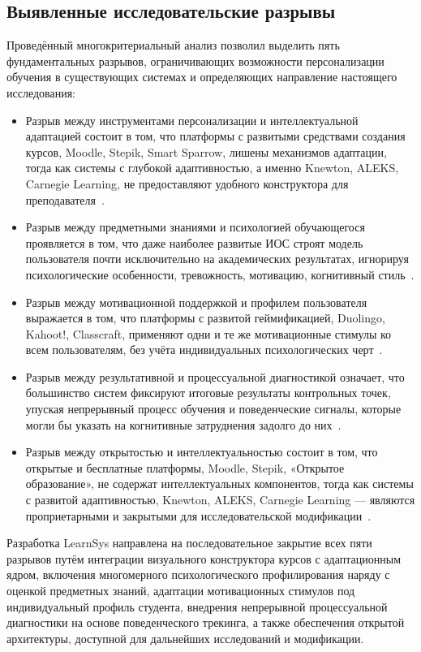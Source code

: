 \subsection{Выявленные исследовательские разрывы}

Проведённый многокритериальный анализ позволил выделить пять
фундаментальных разрывов, ограничивающих возможности
персонализации обучения в существующих системах и
определяющих направление настоящего исследования:

\begin{itemize}
\item Разрыв между инструментами персонализации и интеллектуальной
адаптацией состоит в том, что платформы с развитыми средствами
создания курсов, Moodle, Stepik, Smart Sparrow, лишены
механизмов адаптации, тогда как системы с глубокой адаптивностью, а именно
Knewton, ALEKS, Carnegie Learning, не предоставляют удобного
конструктора для преподавателя~\cite{graf2007adaptive}.
\item Разрыв между предметными знаниями и психологией
обучающегося проявляется в том, что даже наиболее развитые
ИОС строят модель пользователя почти исключительно на
академических результатах, игнорируя психологические
особенности, тревожность, мотивацию, когнитивный
стиль~\cite{brusilovsky2007usermodels}.
\item Разрыв между мотивационной поддержкой и профилем
пользователя выражается в том, что платформы с развитой
геймификацией, Duolingo, Kahoot!, Classcraft, применяют
одни и те же мотивационные стимулы ко всем пользователям,
без учёта индивидуальных психологических
черт~\cite{dominguez2013gamifying}.
\item Разрыв между результативной и процессуальной
диагностикой означает, что большинство систем фиксируют
итоговые результаты контрольных точек, упуская непрерывный
процесс обучения и поведенческие сигналы, которые могли бы
указать на когнитивные затруднения задолго до
них~\cite{ifenthaler2020learning}.
\item Разрыв между открытостью и интеллектуальностью
состоит в том, что открытые и бесплатные платформы, Moodle,
Stepik, «Открытое образование», не содержат
интеллектуальных компонентов, тогда как системы с
развитой адаптивностью, Knewton, ALEKS, Carnegie Learning ---
являются проприетарными и закрытыми для исследовательской
модификации~\cite{review_elearning_2016}.
\end{itemize}

Разработка LearnSys направлена на последовательное закрытие
всех пяти разрывов путём интеграции визуального конструктора
курсов с адаптационным ядром, включения многомерного
психологического профилирования наряду с оценкой предметных
знаний, адаптации мотивационных стимулов под индивидуальный
профиль студента, внедрения непрерывной процессуальной
диагностики на основе поведенческого трекинга, а также
обеспечения открытой архитектуры, доступной для дальнейших
исследований и модификации.

